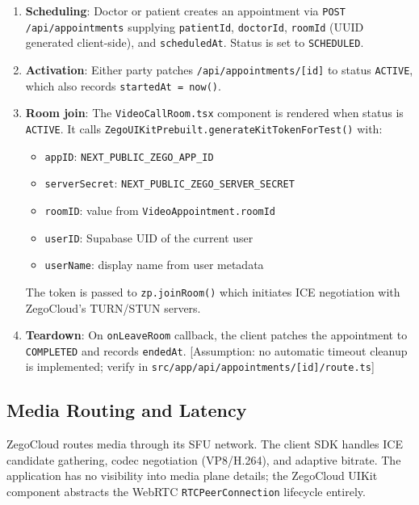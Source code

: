 \documentclass[12pt,a4paper]{report}
\begin{document}
\begin{enumerate}[leftmargin=1.5em, itemsep=0.2em]
  \item \textbf{Scheduling}: Doctor or patient creates an appointment
        via \texttt{POST /api/appointments} supplying
        \texttt{patientId}, \texttt{doctorId}, \texttt{roomId}
        (UUID generated client-side), and \texttt{scheduledAt}.
        Status is set to \texttt{SCHEDULED}.

  \item \textbf{Activation}: Either party patches
        \texttt{/api/appointments/[id]} to status \texttt{ACTIVE},
        which also records \texttt{startedAt = now()}.

  \item \textbf{Room join}: The \texttt{VideoCallRoom.tsx} component
        is rendered when status is \texttt{ACTIVE}. It calls
        \texttt{ZegoUIKitPrebuilt.generateKitTokenForTest()} with:
        \begin{itemize}
          \item \texttt{appID}: \texttt{NEXT\_PUBLIC\_ZEGO\_APP\_ID}
          \item \texttt{serverSecret}: \texttt{NEXT\_PUBLIC\_ZEGO\_SERVER\_SECRET}
          \item \texttt{roomID}: value from \texttt{VideoAppointment.roomId}
          \item \texttt{userID}: Supabase UID of the current user
          \item \texttt{userName}: display name from user metadata
        \end{itemize}
        The token is passed to \texttt{zp.joinRoom()} which initiates
        ICE negotiation with ZegoCloud's TURN/STUN servers.

  \item \textbf{Teardown}: On \texttt{onLeaveRoom} callback, the client
        patches the appointment to \texttt{COMPLETED} and records
        \texttt{endedAt}. [Assumption: no automatic timeout cleanup
        is implemented; verify in \texttt{src/app/api/appointments/[id]/route.ts}]
\end{enumerate}

\subsection{Media Routing and Latency}

ZegoCloud routes media through its SFU network. The client SDK
handles ICE candidate gathering, codec negotiation (VP8/H.264),
and adaptive bitrate. The application has no visibility into media
plane details; the ZegoCloud UIKit component abstracts the WebRTC
\texttt{RTCPeerConnection} lifecycle entirely.
\end{document}
